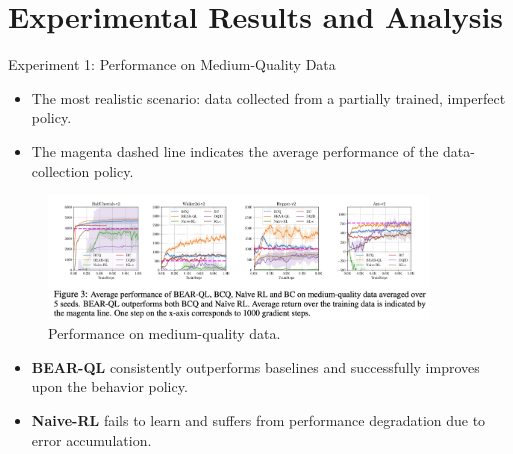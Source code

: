 \documentclass[11pt]{beamer}
\newcommand{\tb}[1]{\textbf{#1}}
\begin{document}
\section{Experimental Results and Analysis}

\begin{frame}{Experiment 1: Performance on Medium-Quality Data}
    \begin{itemize}
        \item The most realistic scenario: data collected from a partially trained, imperfect policy.
        \item The magenta dashed line indicates the average performance of the data-collection policy.
    \end{itemize}
    
    \begin{figure}
        \centering
        \includegraphics[width=0.9\textwidth]{Figure3.png}
        \caption{Performance on medium-quality data.}
    \end{figure}
    
    \begin{itemize}
        \item \tb{BEAR-QL} consistently outperforms baselines and successfully improves upon the behavior policy.
        \item \tb{Naive-RL} fails to learn and suffers from performance degradation due to error accumulation.
    \end{itemize}
\end{frame}
\end{document}
